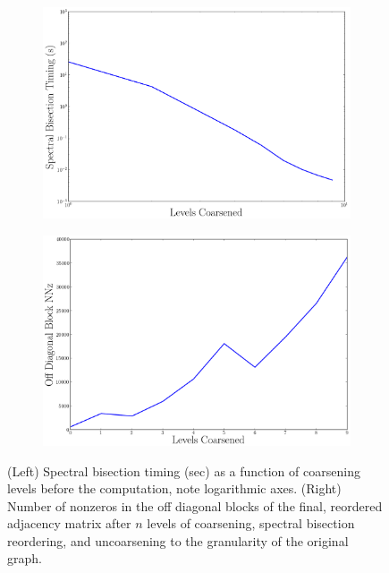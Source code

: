 \documentclass[11pt]{article}
\begin{document}
\begin{figure}
\centering
\begin{subfigure}{.45\textwidth}
        \centering
        \includegraphics[width=\linewidth]{figs/sbTiming.png}
\end{subfigure}
\begin{subfigure}{.45\textwidth}
        \centering
        \includegraphics[width=\linewidth]{figs/offDiagNNz.png}
\end{subfigure}
\caption{(Left) Spectral bisection timing (sec) as a function of coarsening
levels before the computation, note logarithmic axes. (Right) Number of nonzeros
in the off diagonal blocks of the final, reordered adjacency matrix after $n$
levels of coarsening, spectral bisection reordering, and uncoarsening to
the granularity of the original graph.}
\label{fig:tradeoff}
\end{figure}
\end{document}
